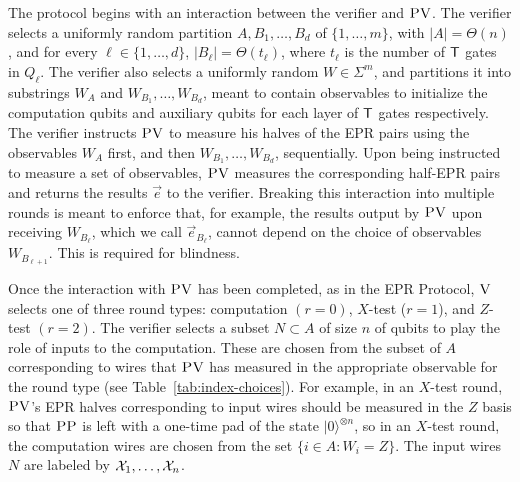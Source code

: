 \documentclass[11pt]{article}
\newcommand{\ket}[1]{|#1\rangle}
\newcommand{\ver}{\textsc{V}}
\newcommand{\pv}{\textsc{PV}}
\newcommand{\pp}{\textsc{PP}}
\begin{document}
The protocol begins with an interaction between the verifier and $\pv$. The verifier selects a uniformly random partition $A,B_1,\dots,B_d$ of $\{1,\dots,m\}$, with $|A|=\Theta(n)$, and for every $\ell\in\{1,\dots,d\}$, $|B_{\ell}|=\Theta(t_\ell)$, where $t_{\ell}$ is the number of $\sf T$ gates in $Q_\ell$. The verifier also selects a uniformly random $W\in\Sigma^m$, and partitions it into substrings $W_A$ and $W_{B_1},\ldots,W_{B_d}$, meant to contain observables to initialize the computation qubits and auxiliary qubits for each layer of ${\sf T}$ gates respectively. The verifier instructs $\pv$ to measure his halves of the EPR pairs using the observables $W_A$ first, and then $W_{B_1},\ldots,W_{B_d}$, sequentially. Upon being instructed to measure a set of observables, $\pv$ measures the corresponding half-EPR pairs and returns the results $\vec{e}$ to the verifier. Breaking this interaction into multiple rounds is meant to enforce that, for example, the results output by $\pv$ upon receiving $W_{B_{\ell}}$, which we call $\vec{e}_{B_{\ell}}$, cannot depend on the choice of observables $W_{B_{\ell+1}}$. This is required for blindness. 

Once the interaction with $\pv$ has been completed, as in the EPR Protocol, $\ver$ selects one of three round types: computation $(r=0)$, $X$-test ($r=1$), and $Z$-test $(r=2)$. 
The verifier selects a subset $N\subset A$ of size $n$ of qubits to play the role of inputs to the computation. These are chosen from the subset of $A$ corresponding to wires that $\pv$ has measured in the appropriate observable for the round type (see Table~\ref{tab:index-choices}). For example, in an $X$-test round, $\pv$'s EPR halves corresponding to input wires should be measured in the $Z$ basis so that $\pp$ is left with a one-time pad of the state $\ket{0}^{\otimes n}$, so in an $X$-test round, the computation wires are chosen from the set $\{i\in A:W_i=Z\}$. The input wires $N$ are labeled by ${\cal X}_1,\dots,{\cal X}_n$. 
\end{document}
